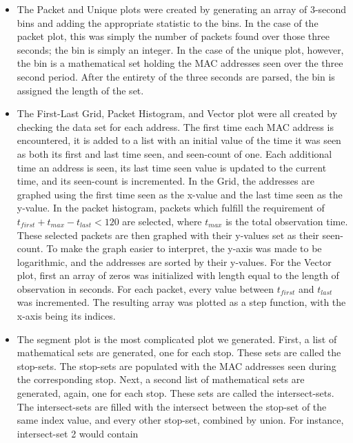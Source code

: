 \documentclass[11pt,journal,compsoc]{IEEEtran} %
\begin{document}
    \begin{itemize}
    \item The Packet and Unique plots were created by generating an array of 3-second bins and adding the appropriate statistic to the bins.
      In the case of the packet plot, this was simply the number of packets found over those three seconds; the bin is simply an integer.
      In the case of the unique plot, however, the bin is a mathematical set holding the MAC addresses seen over the three second period.
      After the entirety of the three seconds are parsed, the bin is assigned the length of the set.
    \item The First-Last Grid, Packet Histogram, and Vector plot were all created by checking the data set for each address.
      The first time each MAC address is encountered, it is added to a list with an initial value of the time it was seen as both its first and last time seen, and seen-count of one.
      Each additional time an address is seen, its last time seen value is updated to the current time, and its seen-count is incremented.
      In the Grid, the addresses are graphed using the first time seen as the x-value and the last time seen as the y-value.
      In the packet histogram, packets which fulfill the requirement of \(t_{first} + t_{max} - t_{last} < 120\) are selected, where \(t_{max}\) is the total observation time.
      These selected packets are then graphed with their y-values set as their seen-count.
      To make the graph easier to interpret, the y-axis was made to be logarithmic, and the addresses are sorted by their y-values.
      For the Vector plot, first an array of zeros was initialized with length equal to the length of observation in seconds.
      For each packet, every value between \(t_{first}\) and \(t_{last}\) was incremented.
      The resulting array was plotted as a step function, with the x-axis being its indices.
    \item The segment plot is the most complicated plot we generated.
      First, a list of mathematical sets are generated, one for each stop.
      These sets are called the stop-sets.
      The stop-sets are populated with the MAC addresses seen during the corresponding stop.
      Next, a second list of mathematical sets are generated, again, one for each stop.
      These sets are called the intersect-sets.
      The intersect-sets are filled with the intersect between the stop-set of the same index value, and every other stop-set, combined by union.
      For instance, intersect-set 2 would contain
      \begin{multline*}

\end{multline*}
\end{itemize}
\end{document}
